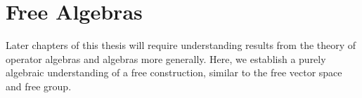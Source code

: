 \section{Free Algebras}%
Later chapters of this thesis will require understanding results from the theory of operator algebras and algebras more generally. Here, we establish a purely algebraic understanding of a free construction, similar to the free vector space and free group. 
%
